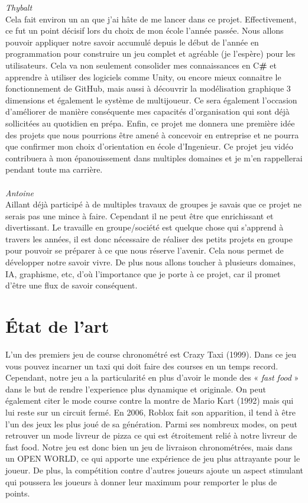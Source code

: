 \documentclass[11pt,a4paper]{article}
\begin{document}
  \textit{Thybalt} \\
  Cela fait environ un an que j'ai hâte de me lancer dans ce projet. Effectivement, ce fut un point décisif lors du choix de mon école l’année passée. Nous allons pouvoir appliquer notre savoir accumulé depuis le début de l’année en programmation pour construire un jeu complet et agréable (je l’espère) pour les utilisateurs. Cela va non seulement consolider mes connaissances en C\textbf{\#} et apprendre à utiliser des logiciels comme Unity, ou encore mieux connaitre le fonctionnement de GitHub, mais aussi à découvrir la modélisation graphique 3 dimensions et également le système de multijoueur. Ce sera également l’occasion d’améliorer de manière conséquente mes capacités d’organisation qui sont déjà sollicitées au quotidien en prépa. Enfin, ce projet me donnera une première idée des projets que nous pourrions être amené à concevoir en entreprise et ne pourra que confirmer mon choix d’orientation en école d’Ingenieur. Ce projet jeu vidéo contribuera à mon épanouissement dans multiples domaines et je m’en rappellerai pendant toute ma carrière. \\
  \\
  \textit{Antoine} \\
  Aillant déjà participé à de multiples travaux de groupes je savais que ce projet ne serais pas une mince à faire. Cependant il ne peut être que enrichissant et divertissant. Le travaille en groupe/société est quelque chose qui s’apprend à travers les années, il est donc nécessaire de réaliser des petits projets en groupe pour pouvoir se préparer à ce que nous réserve l’avenir. Cela nous permet de développer notre savoir vivre. De plus nous allons toucher à plusieurs domaines, IA, graphisme, etc, d’où l’importance que je porte à ce projet, car il promet d’être une flux de savoir conséquent.

\section{État de l'art}
  L’un des premiers jeu de course chronométré est Crazy Taxi (1999). Dans ce jeu vous pouvez incarner un taxi qui doit faire des courses en un temps record. Cependant, notre jeu a la particularité en plus d'avoir le monde des « \textit{fast food }» dans le but de rendre l'experience plus dynamique et originale. On peut également citer le mode course contre la montre de Mario Kart (1992) mais qui lui reste sur un circuit fermé. En 2006, Roblox fait son apparition, il tend  à être l’un des jeux les plus joué de sa génération. Parmi ses nombreux modes, on peut retrouver un mode livreur de pizza ce qui est étroitement relié à notre livreur de fast food. Notre jeu est donc bien un jeu de livraison chronométrées, mais dans un OPEN WORLD, ce qui apporte une expérience de jeu plus attrayante pour le joueur. De plus, la compétition contre d’autres joueurs ajoute un aspect stimulant qui poussera les joueurs à donner leur maximum pour remporter le plus de points.
\end{document}
